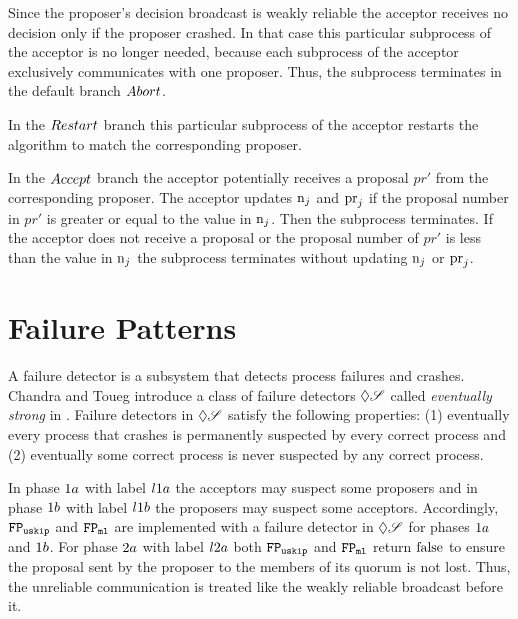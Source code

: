 Since the proposer's decision broadcast is weakly reliable the acceptor receives no decision only if the proposer crashed.
In that case this particular subprocess of the acceptor is no longer needed, because each subprocess of the acceptor exclusively communicates with one proposer.
Thus, the subprocess terminates in the default branch $\mathnormal{Abort}$.

In the $\mathnormal{Restart}$ branch this particular subprocess of the acceptor restarts the algorithm to match the corresponding proposer.

In the $\mathnormal{Accept}$ branch the acceptor potentially receives a proposal $pr'$ from the corresponding proposer.
The acceptor updates $\operatorname{n}_{j}$ and $\operatorname{pr}_{j}$ if the proposal number in $pr'$ is greater or equal to the value in $\operatorname{n}_{j}$.
Then the subprocess terminates.
If the acceptor does not receive a proposal or the proposal number of $pr'$ is less than the value in $\operatorname{n}_{j}$ the subprocess terminates without updating $\operatorname{n}_{j}$ or $\operatorname{pr}_{j}$.

\section{Failure Patterns}
A failure detector is a subsystem that detects process failures and crashes.
Chandra and Toueg introduce a class of failure detectors $\Diamond\mathscr{S}$ called \emph{eventually strong} in \cite{ChandraToueg96}.
Failure detectors in $\Diamond\mathscr{S}$ satisfy the following properties: (1) eventually every process that crashes is permanently suspected by every correct process and (2) eventually some correct process is never suspected by any correct process.

In phase $1a$ with label $l1a$ the acceptors may suspect some proposers and in phase $1b$ with label $l1b$ the proposers may suspect some acceptors.
Accordingly, $\mathtt{FP_{uskip}}$ and $\mathtt{FP_{ml}}$ are implemented with a failure detector in $\Diamond\mathscr{S}$ for phases $1a$ and $1b$.
For phase $2a$ with label $l2a$ both $\mathtt{FP_{uskip}}$ and $\mathtt{FP_{ml}}$ return $\operatorname{false}$ to ensure the proposal sent by the proposer to the members of its quorum is not lost.
Thus, the unreliable communication is treated like the weakly reliable broadcast before it.

